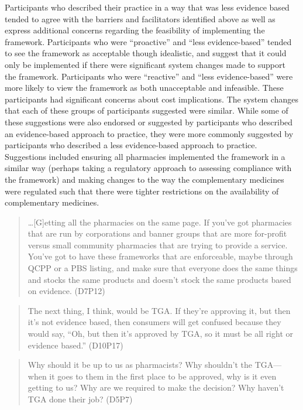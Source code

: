 \documentclass[11pt,a4paper]{article}
\begin{document}
Participants who described their practice in a way that was less
evidence based tended to agree with the barriers and facilitators
identified above as well as express additional concerns regarding the
feasibility of implementing the framework. Participants who were
``proactive'' and ``less evidence-based'' tended to see the framework as
acceptable though idealistic, and suggest that it could only be
implemented if there were significant system changes made to support the
framework. Participants who were ``reactive'' and ``less
evidence-based'' were more likely to view the framework as both
unacceptable and infeasible. These participants had significant concerns
about cost implications. The system changes that each of these groups of
participants suggested were similar. While some of these suggestions
were also endorsed or suggested by participants who described an
evidence-based approach to practice, they were more commonly suggested
by participants who described a less evidence-based approach to
practice. Suggestions included ensuring all pharmacies implemented the
framework in a similar way (perhaps taking a regulatory approach to
assessing compliance with the framework) and making changes to the way
the complementary medicines were regulated such that there were tighter
restrictions on the availability of complementary medicines.

\begin{quote}
\ldots{}{[}G{]}etting all the pharmacies on the same page. If you've got
pharmacies that are run by corporations and banner groups that are more
for-profit versus small community pharmacies that are trying to provide
a service. You've got to have these frameworks that are enforceable,
maybe through QCPP or a PBS listing, and make sure that everyone does
the same things and stocks the same products and doesn't stock the same
products based on evidence. (D7P12)
\end{quote}

\begin{quote}
The next thing, I think, would be TGA. If they're approving it, but then
it's not evidence based, then consumers will get confused because they
would say, ``Oh, but then it's approved by TGA, so it must be all right
or evidence based.'' (D10P17)
\end{quote}

\begin{quote}
Why should it be up to us as pharmacists? Why shouldn't the TGA---when
it goes to them in the first place to be approved, why is it even
getting to us? Why are we required to make the decision? Why haven't TGA
done their job? (D5P7)
\end{quote}
\end{document}
